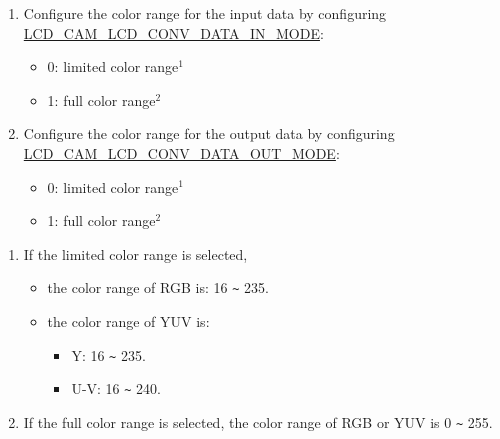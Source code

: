 \documentclass[main\_\_EN.tex]{subfiles}
\begin{document}
\begin{enumerate}
\begin{itemize}
\begin{table}[H]
\begin{threeparttable}
     \end{threeparttable}
    \end{table}
    \end{itemize}
    \item Configure the color range for the input data by configuring \hyperref[fielddesc:LCDCAMLCDCONVDATAINMODE]{LCD\_CAM\_LCD\_CONV\_DATA\_IN\_MODE}:
    \begin{itemize}
        \item 0: limited color range\hyperref[limited-color-range-note]{$^1$}
        \item 1: full color range\hyperref[full-color-range-note]{$^2$}
    \end{itemize}
    \item Configure the color range for the output data by configuring \hyperref[fielddesc:LCDCAMLCDCONVDATAOUTMODE]{LCD\_CAM\_LCD\_CONV\_DATA\_OUT\_MODE}:
    \begin{itemize}
        \item 0: limited color range\hyperref[limited-color-range-note]{$^1$}
        \item 1: full color range\hyperref[full-color-range-note]{$^2$}
    \end{itemize}
\end{enumerate}
\begin{tiplisting}
\vspace{-2em}
\begin{enumerate}
    \item \label{limited-color-range-note} If the limited color range is selected,
        \begin{itemize}
        \item the color range of RGB is: 16 \verb+~+ 235.
        \item the color range of YUV is:
        \begin{itemize}
            \item Y: 16 \verb+~+ 235.
            \item U-V: 16 \verb+~+ 240.
        \end{itemize}
        \end{itemize}
    \item \label{full-color-range-note} If the full color range is selected, the color range of RGB or YUV is 0 \verb+~+ 255.

\end{enumerate}
\end{tiplisting}
\end{document}

